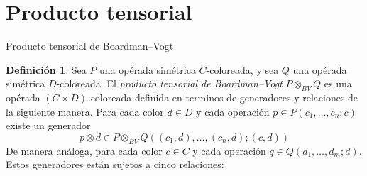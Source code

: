 \documentclass[12pt,aspectratio=169]{beamer}
\numberwithin{equation}{section}
\theoremstyle{definition}
\newtheorem{defi}[teo]{Definici\'on}
\begin{document}
\section{Producto tensorial}

\begin{frame}{Producto tensorial de Boardman--Vogt}
    \begin{defi}
        Sea $P$ una op\'erada sim\'etrica $C$-coloreada, y sea $Q$ una op\'erada sim\'etrica $D$-coloreada. El \emph{producto tensorial de Boardman--Vogt} $P\otimes_{BV}Q$ es una op\'erada $(C\times D)$-coloreada definida en terminos de generadores y relaciones de la siguiente manera.
        Para cada color $d\in D$ y cada operaci\'on $p\in P(c_1,\dots,c_n;c)$ existe un generador
        $$
            p \otimes d \in P\otimes_{BV}Q((c_1,d),\dots,(c_n,d);(c,d))
        $$
        De manera an\'aloga, para cada color $c\in C$ y cada operaci\'on $q\in Q(d_1,\dots,d_m;d)$. %
        Estos generadores est\'an sujetos a cinco relaciones:
    \end{defi}
\end{frame}
\end{document}
